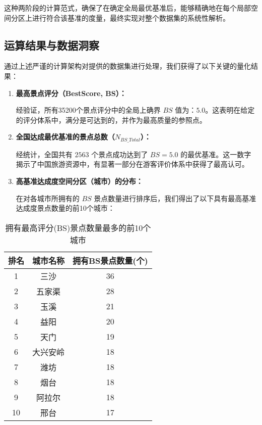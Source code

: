 这种两阶段的计算范式，确保了在确定全局最优基准后，能够精确地在每个局部空间分区上进行符合该基准的度量，最终实现对整个数据集的系统性解析。

\subsection{运算结果与数据洞察}

通过上述严谨的计算架构对提供的数据集进行处理，我们获得了以下关键的量化结果：

\begin{enumerate}
    \item \textbf{最高景点评分（BestScore, BS）：}
    
    经验证，所有35200个景点评分中的全局上确界 $BS$ 值为：$\text{5.0}$。这表明在给定的评分体系中，满分是可达到的，并作为最高质量的参照点。

    \item \textbf{全国达成最优基准的景点总数（$N_{BS\_Total}$）：}
    
    经统计，全国共有 $\text{2563}$ 个景点成功达到了 $BS=5.0$ 的最优基准。这一数字揭示了中国旅游资源中，有显著一部分在游客评价体系中获得了最高认可。

    \item \textbf{高基准达成度空间分区（城市）的分布：}
    
    在对各城市所拥有的 $BS$ 景点数量进行排序后，我们得出了以下具有最高基准达成度景点数量的前10个城市：
\end{enumerate}

\begin{table}[H]
\centering
\caption{拥有最高评分(BS)景点数量最多的前10个城市}
\label{tab:top10cities}
\begin{tabular}{ccc}
\toprule
排名 & 城市名称 & 拥有BS景点数量(个) \\
\midrule
1    & 三沙     & 36                   \\
2    & 五家渠   & 28                   \\
3    & 玉溪     & 21                   \\
4    & 益阳     & 20                   \\
5    & 天门     & 19                   \\
6    & 大兴安岭 & 18                   \\
7    & 潍坊     & 18                   \\
8    & 烟台     & 18                   \\
9    & 阿拉尔   & 18                   \\
10   & 邢台     & 17                   \\
\bottomrule
\end{tabular}
\end{table}

